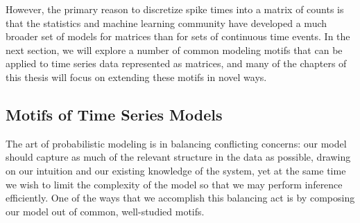 However, the primary reason to discretize spike times into a matrix of
counts is that the statistics and machine learning community have
developed a much broader set of models for matrices than for sets of
continuous time events.  In the next section, we will explore a number
of common modeling motifs that can be applied to time series data
represented as matrices, and many of the chapters of this thesis will
focus on extending these motifs in novel ways.


\subsection{Motifs of Time Series Models}
\label{sec:motifs}
The art of probabilistic modeling is in balancing conflicting concerns:
our model should capture as much of the relevant structure in the data 
as possible, drawing on our intuition and our existing knowledge of the 
system, yet at the same time we wish to limit the complexity of the model
so that we may perform inference efficiently. One of the ways that we 
accomplish this balancing act is by composing our model out of common,
well-studied motifs. 

